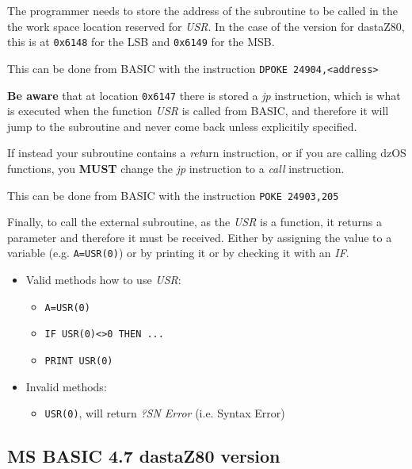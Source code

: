 \documentclass[a4paper,11pt]{article}
\begin{document}
    The programmer needs to store the address of the subroutine to be called in
    the the work space location reserved for \textit{USR}. In the case of the
    version for dastaZ80, this is at \texttt{0x6148} for the LSB and
    \texttt{0x6149} for the MSB.

    This can be done from BASIC with the instruction \texttt{DPOKE 24904,<address>}

    \textbf{Be aware} that at location \texttt{0x6147} there is stored a
    \textit{jp} instruction, which is what is executed when the function
    \textit{USR} is called from BASIC, and therefore it will jump to the
    subroutine and never come back unless explicitily specified.

    If instead your subroutine contains a \textit{ret}urn instruction, or if you
    are calling dzOS functions, you \textbf{MUST} change the \textit{jp}
    instruction to a \textit{call} instruction.

    This can be done from BASIC with the instruction \texttt{POKE 24903,205}

    Finally, to call the external subroutine, as the \textit{USR} is a function,
    it returns a parameter and therefore it must be received. Either by assigning
    the value to a variable (e.g. \texttt{A=USR(0)}) or by printing it or by
    checking it with an \textit{IF}.

    \begin{itemize}
        \item Valid methods how to use \textit{USR}:
        \begin{itemize}
            \item \texttt{A=USR(0)}
            \item \texttt{IF USR(0)<>0 THEN ...}
            \item \texttt{PRINT USR(0)}
        \end{itemize}
        \item Invalid methods:
        \begin{itemize}
            \item \texttt{USR(0)}, will return \textit{?SN Error} (i.e. Syntax Error)
        \end{itemize}
    \end{itemize}

    \subsection{MS BASIC 4.7 dastaZ80 version}
\end{document}
